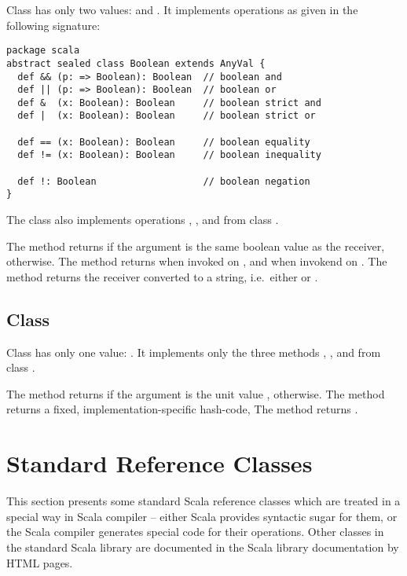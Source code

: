 {{{Class  has only two values:  and
. It implements operations as given in the following
signature:

\begin{lstlisting}
package scala 
abstract sealed class Boolean extends AnyVal {
  def && (p: => Boolean): Boolean  // boolean and
  def || (p: => Boolean): Boolean  // boolean or
  def &  (x: Boolean): Boolean     // boolean strict and
  def |  (x: Boolean): Boolean     // boolean strict or

  def == (x: Boolean): Boolean     // boolean equality
  def != (x: Boolean): Boolean     // boolean inequality

  def !: Boolean                   // boolean negation
}
\end{lstlisting}
The class also implements operations , ,
and  from class .

The  method returns  if the argument is the
same boolean value as the receiver,  otherwise.  The
 method returns  when invoked on , 
and  when invokend on . The  method
returns the receiver converted to a string, i.e.\ either 
or .

\subsection{Class \large{}}

Class  has only one value: \code{()}. It implements only
the three methods , , and 
from class .

The  method returns  if the argument is the
unit value \code{()},  otherwise.  The
 method returns a fixed, implementation-specific hash-code, 
The  method returns .

\section{Standard Reference Classes}
\label{cls:reference}

This section presents some standard Scala reference classes which are
treated in a special way in Scala compiler -- either Scala provides
syntactic sugar for them, or the Scala compiler generates special code
for their operations. Other classes in the standard Scala library are
documented in the Scala library documentation by HTML pages.

}}}
